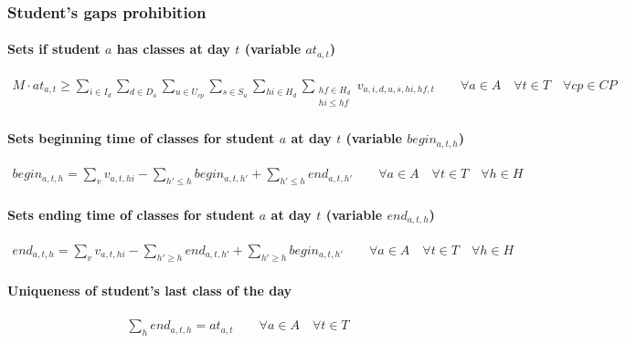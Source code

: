 \subsubsection{Student's gaps prohibition}
\label{constrStudentGap}

\paragraph{Sets if student $a$ has classes at day $t$ (variable $at_{a,t}$)}
\begin{eqnarray}
M \cdot at_{a,t} \ge \sum\limits_{i \in I_{d}} \sum\limits_{d \in D_{a}} \sum\limits_{u \in U_{cp}} \sum\limits_{s \in S_{u}} \sum\limits_{hi \in H_{d}} \sum_{\substack {hf \in H_{d} \\ hi\le hf}} v_{a,i,d,u,s,hi,hf,t} \nonumber \qquad 
\forall a \in A \quad
\forall t \in T \quad
\forall cp \in CP
\end{eqnarray}

\paragraph{Sets beginning time of classes for student $a$ at day $t$ (variable $begin_{a,t,h}$)}
\begin{eqnarray}
begin_{a,t,h} = \sum\limits_{v} v_{a,t,hi} - \sum\limits_{h'\le h} begin_{a,t,h'} + \sum\limits_{h'\le h} end_{a,t,h'} \nonumber \qquad
\forall a \in A \quad
\forall t \in T \quad
\forall h \in H
\end{eqnarray}

\paragraph{Sets ending time of classes for student $a$ at day $t$ (variable $end_{a,t,h}$)}
\begin{eqnarray}
end_{a,t,h} = \sum\limits_{v} v_{a,t,hi} - \sum\limits_{h'\ge h} end_{a,t,h'} + \sum\limits_{h'\ge h} begin_{a,t,h'} \nonumber \qquad
\forall a \in A \quad
\forall t \in T \quad
\forall h \in H
\end{eqnarray}

\paragraph{Uniqueness of student's last class of the day}
\begin{eqnarray}
\sum\limits_{h} end_{a,t,h} = at_{a,t} \nonumber \qquad
\forall a \in A \quad
\forall t \in T
\end{eqnarray}

